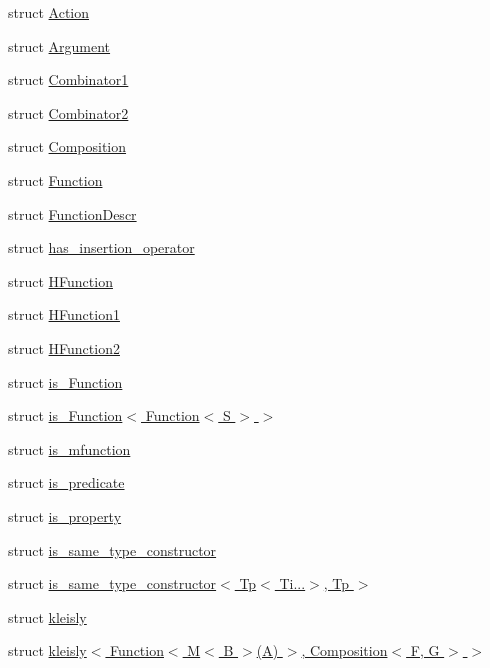 \begin{DoxyCompactItemize}
\item 
struct \hyperlink{structpfq__lang_1_1Action}{Action}
\item 
struct \hyperlink{structpfq__lang_1_1Argument}{Argument}
\item 
struct \hyperlink{structpfq__lang_1_1Combinator1}{Combinator1}
\item 
struct \hyperlink{structpfq__lang_1_1Combinator2}{Combinator2}
\item 
struct \hyperlink{structpfq__lang_1_1Composition}{Composition}
\item 
struct \hyperlink{structpfq__lang_1_1Function}{Function}
\item 
struct \hyperlink{structpfq__lang_1_1FunctionDescr}{Function\+Descr}
\item 
struct \hyperlink{structpfq__lang_1_1has__insertion__operator}{has\+\_\+insertion\+\_\+operator}
\item 
struct \hyperlink{structpfq__lang_1_1HFunction}{H\+Function}
\item 
struct \hyperlink{structpfq__lang_1_1HFunction1}{H\+Function1}
\item 
struct \hyperlink{structpfq__lang_1_1HFunction2}{H\+Function2}
\item 
struct \hyperlink{structpfq__lang_1_1is__Function}{is\+\_\+\+Function}
\item 
struct \hyperlink{structpfq__lang_1_1is__Function_3_01Function_3_01S_01_4_01_4}{is\+\_\+\+Function$<$ Function$<$ S $>$ $>$}
\item 
struct \hyperlink{structpfq__lang_1_1is__mfunction}{is\+\_\+mfunction}
\item 
struct \hyperlink{structpfq__lang_1_1is__predicate}{is\+\_\+predicate}
\item 
struct \hyperlink{structpfq__lang_1_1is__property}{is\+\_\+property}
\item 
struct \hyperlink{structpfq__lang_1_1is__same__type__constructor}{is\+\_\+same\+\_\+type\+\_\+constructor}
\item 
struct \hyperlink{structpfq__lang_1_1is__same__type__constructor_3_01Tp_3_01Ti_8_8_8_4_00_01Tp_01_4}{is\+\_\+same\+\_\+type\+\_\+constructor$<$ Tp$<$ Ti...$>$, Tp $>$}
\item 
struct \hyperlink{structpfq__lang_1_1kleisly}{kleisly}
\item 
struct \hyperlink{structpfq__lang_1_1kleisly_3_01Function_3_01M_3_01B_01_4_07A_08_01_4_00_01Composition_3_01F_00_01G_01_4_01_4}{kleisly$<$ Function$<$ M$<$ B $>$(\+A) $>$, Composition$<$ F, G $>$ $>$}

\end{DoxyCompactItemize}
